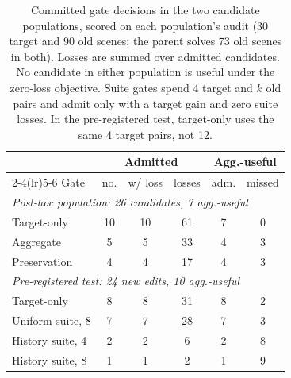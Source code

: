 \begin{table}[t]
\centering
\small
\setlength{\tabcolsep}{3.0pt}
\begin{tabular}{lccccc}
\toprule
 & \multicolumn{3}{c}{Admitted} & \multicolumn{2}{c}{Agg.-useful} \\
\cmidrule(lr){2-4}\cmidrule(lr){5-6}
Gate & no. & w/ loss & losses & adm. & missed \\
\midrule
\multicolumn{6}{l}{\emph{Post-hoc population: 26 candidates, 7 agg.-useful}} \\
Target-only & 10 & 10 & 61 & 7 & 0 \\
Aggregate & 5 & 5 & 33 & 4 & 3 \\
Preservation & 4 & 4 & 17 & 4 & 3 \\
\midrule
\multicolumn{6}{l}{\emph{Pre-registered test: 24 new edits, 10 agg.-useful}} \\
Target-only & 8 & 8 & 31 & 8 & 2 \\
Uniform suite, 8 & 7 & 7 & 28 & 7 & 3 \\
History suite, 4 & 2 & 2 & 6 & 2 & 8 \\
History suite, 8 & 1 & 1 & 2 & 1 & 9 \\
\bottomrule
\end{tabular}
\caption{Committed gate decisions in the two candidate populations, scored on each population's audit (30 target and 90 old scenes; the parent solves 73 old scenes in both). Losses are summed over admitted candidates. No candidate in either population is useful under the zero-loss objective. Suite gates spend 4 target and $k$ old pairs and admit only with a target gain and zero suite losses. In the pre-registered test, target-only uses the same 4 target pairs, not 12.}
\label{tab:gates2}
\end{table}
